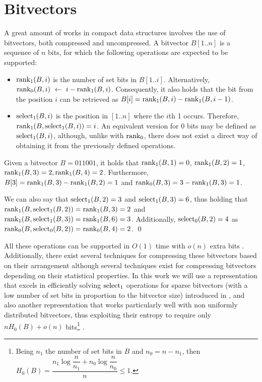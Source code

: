 \documentclass[a4paper,10pt,twoside]{book}
\begin{document}
	\section{Bitvectors}
	\label{sec:bit}
	A great amount of works in compact data structures involves the use of bitvectors, both compressed and uncompressed. A bitvector $B[1..n]$ is a sequence of $n$ bits, for which the following operations are expected to be supported:

    \begin{itemize}
        \item $\operatorname{rank}_1(B,i)$ is the number of set bits in $B[1..i]$. Alternatively, $\operatorname{rank}_0(B,i)~\leftarrow~i - \operatorname{rank}_1(B,i)$. Consequently, it also holds that the bit from the position $i$ can be retrieved as $B[i] = \operatorname{rank}_1(B,i) - \operatorname{rank}_1(B,i-1)$.
        \item $\operatorname{select}_1(B,i)$ is the position in $[1..n]$ where the $i$th 1 occurs. Therefore, $\operatorname{rank}_1(B,\operatorname{select}_1(B,i)) = i$. An equivalent version for 0 bits may be defined as $\operatorname{select}_1(B,i)$, although, unlike with $\operatorname{rank}_0$, there does not exist a direct way of obtaining it from the previously defined operations.
    \end{itemize}
    
    \begin{example}
        Given a bitvector $B = 011001$, it holds that $\operatorname{rank}_1(B,1) = 0$, $\operatorname{rank}_1(B,2) = 1$, $\operatorname{rank}_1(B,3) = 2, \operatorname{rank}_1(B,4) = 2$. Furthermore, $B[3] = \operatorname{rank}_1(B,3) - \operatorname{rank}_1(B,2) = 1$ and $\operatorname{rank}_0(B,3) = 3 - \operatorname{rank}_1(B,3) = 1$.
        
        We can also say that $\operatorname{select}_1(B,2) = 3$ and $\operatorname{select}_1(B,3) = 6$, thus holding that $\operatorname{rank}_1(B,\operatorname{select}_1(B,2)) = \operatorname{rank}_1(B,3) = 2$ and $\operatorname{rank}_1(B,\operatorname{select}_1(B,3)) = \operatorname{rank}_1(B,6) = 3$. Additionally, $\operatorname{select}_0(B,2) = 4$ as $\operatorname{rank}_0(B,\operatorname{select}_0(B,2)) = \operatorname{rank}_0(B,4) = 2$.
        \qed
    \end{example}
    
    All these operations can be supported in $O(1)$ time with $o(n)$ extra bits \cite{Jac89,Mun96}. 
    Additionally, there exist several techniques for compressing these bitvectors based on their arrangement although several techniques exist for compressing bitvectors depending on their statistical properties. In this work we will use a representation that excels in efficiently solving $\operatorname{select}_1$ operations for sparse bitvectors (with a low number of set bits in proportion to the bitvector size) introduced in \cite{okanohara2007practical}, and also another representation that works particularly well with non uniformly distributed bitvectors, thus exploiting their entropy to require only $nH_0(B) + o(n)$ bits\footnote{Being $n_1$ the number of set bits in $B$ and $n_0 = n - n_1$, then $H_0(B) = \dfrac{n_1\log\dfrac{n}{n_1} + n_0\log\dfrac{n}{n_0}}{n} \leq 1$.} \cite{Raman:2002:SID:545381.545411}.
	
\end{document}
